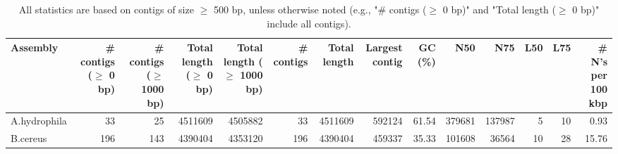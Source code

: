 \documentclass[12pt,a4paper]{article}
\begin{document}
\begin{table}[ht]
\begin{center}
\caption{All statistics are based on contigs of size $\geq$ 500 bp, unless otherwise noted (e.g., "\# contigs ($\geq$ 0 bp)" and "Total length ($\geq$ 0 bp)" include all contigs).}
\begin{tabular}{|l*{13}{|r}|}
\hline
Assembly & \# contigs ($\geq$ 0 bp) & \# contigs ($\geq$ 1000 bp) & Total length ($\geq$ 0 bp) & Total length ($\geq$ 1000 bp) & \# contigs & Total length & Largest contig & GC (\%) & N50 & N75 & L50 & L75 & \# N's per 100 kbp \\ \hline
A.hydrophila & 33 & 25 & 4511609 & 4505882 & 33 & 4511609 & 592124 & 61.54 & 379681 & 137987 & 5 & 10 & 0.93 \\ \hline
B.cereus & 196 & 143 & 4390404 & 4353120 & 196 & 4390404 & 459337 & 35.33 & 101608 & 36564 & 10 & 28 & 15.76 \\ \hline
\end{tabular}
\end{center}
\end{table}
\end{document}
